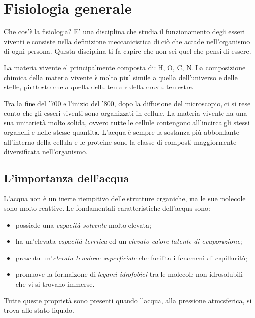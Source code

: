 \documentclass[]{article}
\begin{document}
\section{Fisiologia generale}\label{fisiologia-generale}

Che cos'è la fisiologia? E' una disciplina che studia il funzionamento
degli esseri viventi e consiste nella definizione meccanicistica di ciò
che accade nell'organismo di ogni persona. Questa disciplina ti fa
capire che non sei quel che pensi di essere.

La materia vivente e' principalmente composta di: H, O, C, N. La
composizione chimica della materia vivente è molto piu' simile a quella
dell'universo e delle stelle, piuttosto che a quella della terra e della
crosta terrestre.

Tra la fine del '700 e l'inizio del '800, dopo la diffusione del
microscopio, ci si rese conto che gli esseri viventi sono organizzati in
cellule. La materia vivente ha una sua unitarietà molto solida, ovvero
tutte le cellule contengono all'incirca gli stessi organelli e nelle
stesse quantità. L'acqua è sempre la sostanza più abbondante all'interno
della cellula e le proteine sono la classe di composti maggiormente
diversificata nell'organismo.

\subsection{L'importanza dell'acqua}\label{limportanza-dellacqua}

L'acqua non è un inerte riempitivo delle strutture organiche, ma le sue
molecole sono molto reattive. Le fondamentali caratteristiche dell'acqua
sono:

\begin{itemize}
\itemsep1pt\parskip0pt
\item
  possiede una \emph{capacità solvente} molto elevata;
\item
  ha un'elevata \emph{capacità termica} ed un \emph{elevato calore
  latente di evaporazione};
\item
  presenta un'\emph{elevata tensione superficiale} che facilita i
  fenomeni di capillarità;
\item
  promuove la formaizone di \emph{legami idrofobici} tra le molecole non
  idrosolubili che vi si trovano immerse.
\end{itemize}

Tutte queste proprietà sono presenti quando l'acqua, alla pressione
atmosferica, si trova allo stato liquido.
\end{document}
